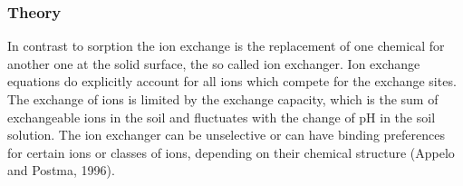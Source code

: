 
\subsubsection*{Theory}

In contrast to sorption the ion exchange is the replacement of one chemical for another one at the solid surface, the so called ion exchanger. Ion exchange equations do explicitly account for all ions which compete for the exchange sites. The exchange of ions is limited by the exchange capacity, which is the sum of exchangeable ions in the soil and fluctuates with the change of pH in the soil solution. The ion exchanger can be unselective or can have binding preferences for certain ions or classes of ions, depending on their chemical structure (Appelo and Postma, 1996). 